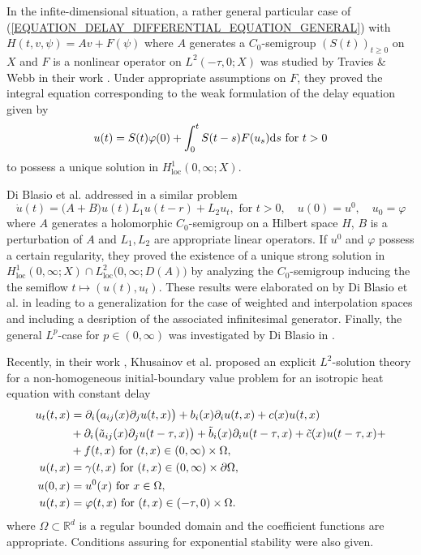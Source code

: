 \documentclass[12pt]{article}
\numberwithin{equation}{section}
\numberwithin{equation}{section}
\begin{document}
In the infite-dimensional situation, a rather general particular case of (\ref{EQUATION_DELAY_DIFFERENTIAL_EQUATION_GENERAL}) with $H(t, v, \psi) = A v + F(\psi)$
where $A$ generates a $C_{0}$-semigroup $(S(t))_{t \geq 0}$ on $X$ and $F$ is a nonlinear operator on $L^{2}(-\tau, 0; X)$
was studied by Travies \& Webb in their work \cite{TraWe1976}.
Under appropriate assumptions on $F$, they proved the integral equation corresponding to the weak formulation
of the delay equation given by
\begin{equation}
	u(t) = S(t) \varphi(0) + \int_{0}^{t} S(t - s) F(u_{s}) \mathrm{d}s \text{ for } t > 0
	\notag
\end{equation}
to possess a unique solution in $H^{1}_{\mathrm{loc}}(0, \infty; X)$.

Di Blasio et al. addressed in \cite{DiBlKuSi1983} a similar problem
\begin{equation}
	\dot{u}(t) = \big(A + B\big) u(t) L_{1} u(t - r) + L_{2} u_{t},
	\text{ for } t > 0, \quad u(0) = u^{0}, \quad u_{0} = \varphi
	\label{EQUATION_DELAY_DI_BLASIO}
\end{equation}
where $A$ generates a holomorphic $C_{0}$-semigroup on a Hilbert space $H$, $B$ is a perturbation of $A$
and $L_{1}, L_{2}$ are appropriate linear operators.
If $u^{0}$ and $\varphi$ possess a certain regularity,
they proved the existence of a unique strong solution in $H^{1}_{\mathrm{loc}}(0, \infty; X) \cap L^{2}_{\mathrm{loc}}\big(0, \infty; D(A)\big)$
by analyzing the $C_{0}$-semigroup inducing the the semiflow $t \mapsto (u(t), u_{t})$.
These results were elaborated on by Di Blasio et al. in \cite{DiBlKuSi1984}
leading to a generalization for the case of weighted and interpolation spaces and
including a desription of the associated infinitesimal generator.
Finally, the general $L^{p}$-case for $p \in (0, \infty)$ was investigated by Di Blasio in \cite{DiBl2003}.

Recently, in their work \cite{KhuPoRa2013}, Khusainov et al. proposed an explicit $L^{2}$-solution theory
for a non-homogeneous initial-boundary value problem for an isotropic heat equation with constant delay
\begin{equation}
	\begin{split}
		u_{t}(t, x) &=
		\partial_{i} \big(a_{ij}(x) \partial_{j} u(t, x)\big) + b_{i}(x) \partial_{i} u(t, x) + c(x) u(t, x) \\
		&+ \partial_{i} \big(\tilde{a}_{ij}(x) \partial_{j} u(t - \tau, x)\big) + \tilde{b}_{i}(x) \partial_{i} u(t - \tau, x) + \tilde{c}(x) u(t - \tau, x) + \\
		&+ f(t, x) \text{ for } (t, x) \in (0, \infty) \times \Omega, \\
		u(t, x) &= \gamma(t, x) \text{ for } (t, x) \in (0, \infty) \times \partial \Omega, \\
		u(0, x) &= u^{0}(x) \text{ for } x \in \Omega, \\
		u(t, x) &= \varphi(t, x) \text{ for } (t, x) \in (-\tau, 0) \times \Omega.
	\end{split}
	\notag
\end{equation}
where $\Omega \subset \mathbb{R}^{d}$ is a regular bounded domain
and the coefficient functions are appropriate.
Conditions assuring for exponential stability were also given.
\end{document}
